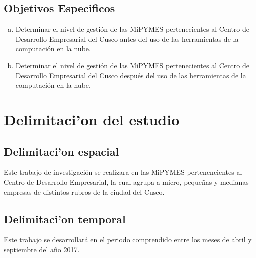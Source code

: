 \subsection{Objetivos Especificos}
\begin{enumerate}[a.]
\item Determinar el nivel de gesti\'on de las MiPYMES pertenecientes al Centro de
Desarrollo Empresarial del Cusco antes del uso de las herramientas de la
computaci\'on en la nube.
\item Determinar el nivel de gesti\'on de las MiPYMES pertenecientes al Centro de
Desarrollo Empresarial del Cusco despu\'es del uso de las herramientas de la
computaci\'on en la nube.
\end{enumerate}
\section{Delimitaci'on del estudio}
\subsection{Delimitaci'on espacial}
Este trabajo de investigaci\'on se realizara en las MiPYMES pertenencientes al
Centro de Desarrollo Empresarial, la cual agrupa a micro, peque\~nas y
medianas empresas de distintos rubros de la ciudad del Cusco.

\subsection{Delimitaci'on temporal}
Este trabajo se desarrollar\'a en el periodo comprendido entre los meses de abril
y septiembre del a\~no 2017.
